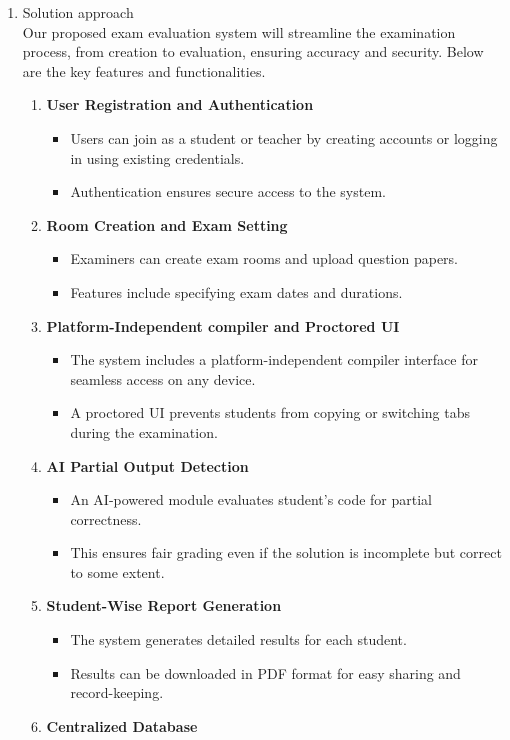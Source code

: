 \documentclass[14pt]{article}
\begin{document}
\begin{enumerate}
\item Solution approach \\
\tabto{.5cm}Our proposed exam evaluation system will streamline the examination process, from creation to evaluation, ensuring accuracy and security. Below are the key features and functionalities.
\begin{enumerate}
\item \textbf{User Registration and Authentication}
\begin{itemize}
\item Users can join as a student or teacher by creating accounts or logging in using existing credentials.
\item Authentication ensures secure access to the system.
\end{itemize}
\item \textbf{Room Creation and Exam Setting}
\begin{itemize}
\item Examiners can create exam rooms and upload question papers.
\item Features include specifying exam dates and durations.
\end{itemize}
\item \textbf{Platform-Independent compiler and Proctored UI}
\begin{itemize}
\item The system includes a platform-independent compiler interface for seamless access on any device.
\item A proctored UI prevents students from copying or switching tabs during the examination.
\end{itemize}
\item \textbf{AI Partial Output Detection}
\begin{itemize}
\item An AI-powered module evaluates student's code for partial correctness.
\item This ensures fair grading even if the solution is incomplete but correct to some extent.
\end{itemize}
\item \textbf{Student-Wise Report Generation}
\begin{itemize}
\item The system generates detailed results for each student.
\item Results can be downloaded in PDF format for easy sharing and record-keeping.
\end{itemize}
\item \textbf{Centralized Database}

\end{enumerate}
\end{enumerate}
\end{document}
